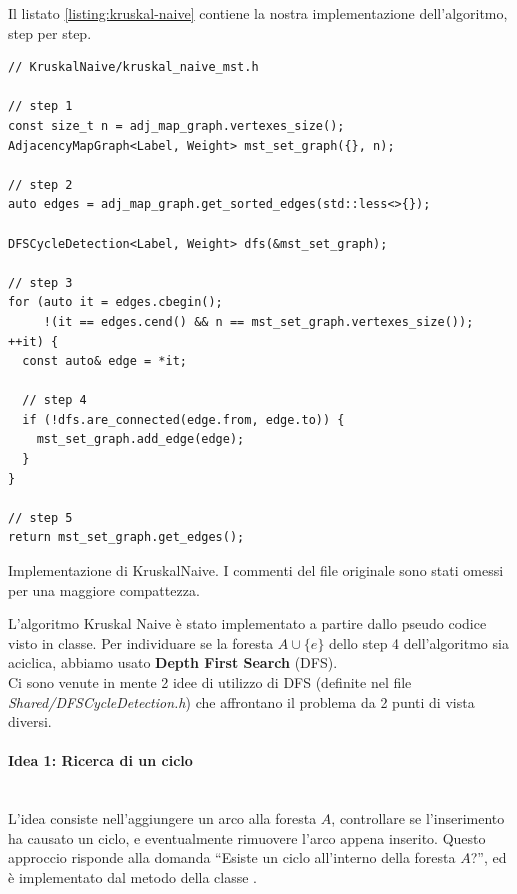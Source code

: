 \noindent Il listato \ref{listing:kruskal-naive} contiene la nostra implementazione dell'algoritmo, step per step.

\begin{listing}[!ht]
\begin{verbatim}
// KruskalNaive/kruskal_naive_mst.h

// step 1
const size_t n = adj_map_graph.vertexes_size();
AdjacencyMapGraph<Label, Weight> mst_set_graph({}, n);

// step 2
auto edges = adj_map_graph.get_sorted_edges(std::less<>{});

DFSCycleDetection<Label, Weight> dfs(&mst_set_graph);

// step 3
for (auto it = edges.cbegin();
     !(it == edges.cend() && n == mst_set_graph.vertexes_size()); ++it) {
  const auto& edge = *it;

  // step 4
  if (!dfs.are_connected(edge.from, edge.to)) {
    mst_set_graph.add_edge(edge);
  }
}

// step 5
return mst_set_graph.get_edges();
\end{verbatim}
\caption{Implementazione di KruskalNaive. I commenti del file originale sono stati omessi per una maggiore compattezza.}
\label{listing:kruskal-naive}
\end{listing}

\noindent L'algoritmo Kruskal Naive è stato implementato a partire dallo pseudo codice visto in classe. Per individuare se la foresta $A \cup \{ e \}$ dello step 4 dell'algoritmo sia aciclica, abbiamo usato \textbf{Depth First Search} (DFS). \\

\noindent Ci sono venute in mente 2 idee di utilizzo di DFS (definite nel file \textit{Shared/DFSCycleDetection.h}) che affrontano il problema da 2 punti di vista diversi.

\paragraph{Idea 1: Ricerca di un ciclo}\mbox{} \\

\noindent L'idea consiste nell'aggiungere un arco alla foresta $A$, controllare se l'inserimento ha causato un ciclo, e eventualmente rimuovere l'arco appena inserito. Questo approccio risponde alla domanda ``Esiste un ciclo all'interno della foresta $A$?'', ed è implementato dal metodo  della classe .

